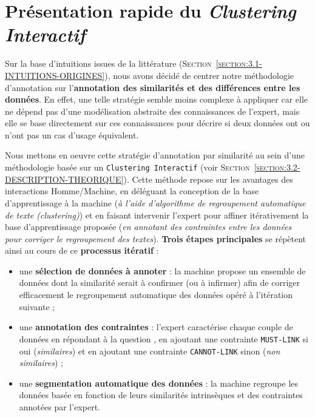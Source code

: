 	
	\newpage
	\section{Présentation rapide du \textit{Clustering Interactif}}
		\label{section:5.1-GUIDE-PRESENTATION-RAPIDE}
		
		Sur la base d'intuitions issues de la littérature (\textsc{Section~\ref{section:3.1-INTUITIONS-ORIGINES}}), nous avons décidé de centrer notre méthodologie d'annotation sur l'\textbf{annotation des similarités et des différences entre les données}.
		En effet, une telle stratégie semble moins complexe à appliquer car elle ne dépend pas d'une modélisation abstraite des connaissances de l'expert, mais elle se base directement sur ces connaissances pour décrire si deux données ont ou n'ont pas un cas d'usage équivalent.
		
		Nous mettons en oeuvre cette stratégie d'annotation par similarité au sein d'une méthodologie basée sur un \texttt{Clustering Interactif} (voir \textsc{Section~\ref{section:3.2-DESCRIPTION-THEORIQUE}}).
		Cette méthode repose sur les avantages des interactions Homme/Machine, en déléguant la conception de la base d'apprentissage à la machine (\textit{à l'aide d'algorithme de regroupement automatique de texte (clustering)}) et en faisant intervenir l'expert pour affiner itérativement la base d'apprentissage proposée (\textit{en annotant des contraintes entre les données pour corriger le regroupement des textes}).
		\textbf{Trois étapes principales} se répètent ainsi au cours de ce \textbf{processus itératif} :
		\begin{itemize}
			\item une \textbf{sélection de données à annoter} :
			la machine propose un ensemble de données dont la similarité serait à confirmer (ou à infirmer) afin de corriger efficacement le regroupement automatique des données opéré à l'itération suivante ;
			\item une \textbf{annotation des contraintes} :
			l'expert caractérise chaque couple de données en répondant à la question , en ajoutant une contrainte \texttt{MUST-LINK} si oui (\textit{similaires}) et en ajoutant une contrainte \texttt{CANNOT-LINK} sinon (\textit{non similaires}) ;
			\item une \textbf{segmentation automatique des données} : la machine regroupe les données basée en fonction de leurs similarités intrinsèques et des contraintes annotées par l'expert.
		\end{itemize}
		
